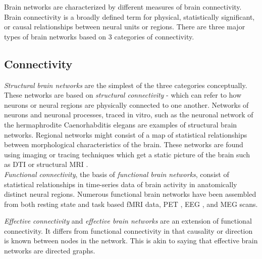	Brain networks are characterized by different measures of brain connectivity. Brain connectivity is a broadly defined term for physical, statistically significant, or causal relationships between neural units or regions. There are three major types of brain networks based on 3 categories of connectivity. 
\subsection*{Connectivity}
	\textit{Structural brain networks} are the simplest of the three categories conceptually. These networks are based on \textit{structural connectivity} - which can refer to how neurons or neural regions are physically connected to one another. Networks of neurons and neuronal processes, traced in vitro, such as the neuronal network of the hermaphrodite Caenorhabditis elegans \cite{white86} are examples of structural brain networks. Regional networks might consist of a map of statistical relationships between morphological characteristics of the brain. These networks are found using imaging or tracing techniques which get a static picture of the brain such as DTI \cite{iturria07,iturria08} or structural MRI \cite{lerch06}.\\ 

	\textit{Functional connectivity}, the basis of \textit{functional brain networks}, consist of statistical relationships in time-series data of brain activity in anatomically distinct neural regions. Numerous functional brain networks have been assembled from both resting state \cite{van10} and task based \cite{rissman04,koshino05}fMRI data, PET \cite{friston93}, EEG \cite{lowe98, joudaki12}, and MEG \cite{stam09} scans.

	\textit{Effective connectivity} and \textit{effective brain networks} are an extension of functional connectivity. It differs from functional connectivity in that causality or direction is known between nodes in the network. This is akin to saying that effective brain networks are directed graphs. 


